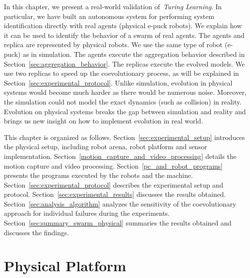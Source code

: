 In this chapter, we present a real-world validation of~\textit{Turing Learning}. In particular, we have built an autonomous system for performing system identification directly with real agents (physical e-puck robots). We explain how it can be used to identify the behavior of a swarm of real agents. The agents and replica are represented by physical robots. We use the same type of robot (e-puck) as in simulation. The agents execute the aggregation behavior described in Section~\ref{sec:aggregation_behavior}. The replicas execute the evolved models. We use two replicas to speed up the coevolutionary process, as will be explained in Section~\ref{sec:experimental_protocol}. Unlike simulation, evolution in physical systems would become much harder as there would be numerous noise. Moreover, the simulation could not model the exact dynamics (such as collision) in reality. Evolution on physical systems breaks the gap between simulation and reality and brings us new insight on how to implement evolution in real world. 

This chapter is organized as follows. Section~\ref{sec:experimental_setup} introduces the physical setup, including robot arena, robot platform and sensor implementation. Section~\ref{motion_capture_and_video_processing} details the motion capture and video processing. Section~\ref{pc_and_robot_programs} presents the programs executed by the robots and the machine. Section~\ref{sec:experimental_protocol} describes the experimental setup and protocol. Section~\ref{sec:experimental_results} discusses the results obtained. Section~\ref{sec:analysis_algorithm} analyzes the sensitivity of the coevolutionary approach for individual failures during the experiments. Section~\ref{sec:summary_swarm_physical} summaries the results obtained and discusses the findings.

\section{Physical Platform}\label{sec:experimental_setup_swarm_physical}

